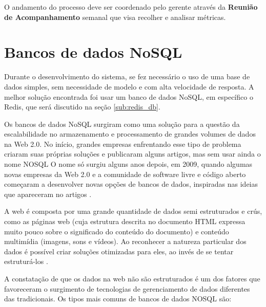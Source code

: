 \documentclass[a4paper,12pt]{monografia}
\begin{document}
O andamento do processo deve ser coordenado pelo gerente através da \textbf{Reunião de Acompanhamento} semanal que visa recolher e analisar métricas.

\section{Bancos de dados NoSQL} %
\label{sec:bancos_de_dados_nosql}

Durante o desenvolvimento do sistema, se fez necessário o uso de uma base de dados simples, sem necessidade de modelo e com alta velocidade de resposta. A melhor solução encontrada foi usar um banco de dados NoSQL, em específico o Redis, que será discutido na seção \ref{sub:redis_db}.

Os bancos de dados NoSQL surgiram como uma solução para a questão da escalabilidade no armazenamento e processamento de grandes volumes de dados na Web 2.0. No início, grandes empresas enfrentando esse tipo de problema criaram suas próprias soluções e publicaram alguns artigos, mas sem usar ainda o nome NOSQL O nome só surgiu alguns anos depois, em 2009, quando algumas novas empresas da Web 2.0 e a comunidade de software livre e código aberto começaram a desenvolver novas opções de bancos de dados, inspiradas nas ideias que apareceram no artigos \cite{de2010nosql}.

\begin{citacao}
A web é composta por uma grande quantidade de dados semi estruturados e crús, como as páginas web (cuja estrutura descrita no documento HTML expressa muito pouco sobre o significado do conteúdo do documento) e conteúdo multimídia (imagens, sons e vídeos). Ao reconhecer a natureza particular dos dados é possível criar soluções otimizadas para eles, ao invés de se tentar estruturá-los \cite{de2010nosql}.
\end{citacao}

A constatação de que os dados na web não são estruturados é um dos fatores que favoreceram o surgimento de tecnologias de gerenciamento de dados diferentes das tradicionais. Os tipos mais comuns de bancos de dados NOSQL são:
\end{document}
